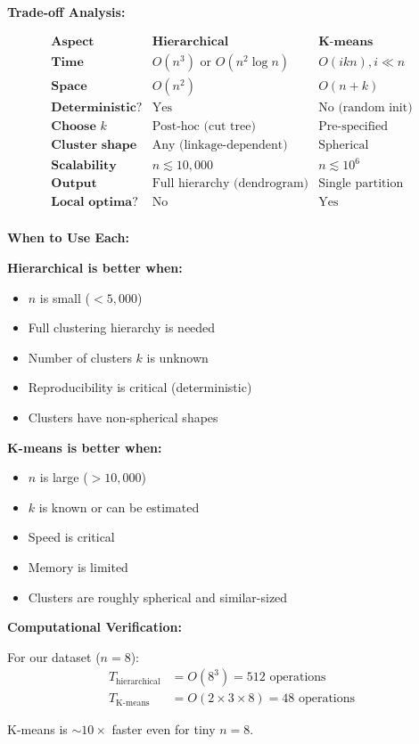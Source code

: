\documentclass[12pt]{article}
\begin{document}
\begin{explanation}
\textbf{Trade-off Analysis:}

\[
\begin{array}{l|l|l}
\textbf{Aspect} & \textbf{Hierarchical} & \textbf{K-means} \\
\hline
\textbf{Time} & O(n^3) \text{ or } O(n^2 \log n) & O(ikn), i \ll n \\
\textbf{Space} & O(n^2) & O(n + k) \\
\textbf{Deterministic?} & \text{Yes} & \text{No (random init)} \\
\textbf{Choose } k & \text{Post-hoc (cut tree)} & \text{Pre-specified} \\
\textbf{Cluster shape} & \text{Any (linkage-dependent)} & \text{Spherical} \\
\textbf{Scalability} & n \lesssim 10{,}000 & n \lesssim 10^6 \\
\textbf{Output} & \text{Full hierarchy (dendrogram)} & \text{Single partition} \\
\textbf{Local optima?} & \text{No} & \text{Yes} \\
\end{array}
\]

\textbf{When to Use Each:}

\textbf{Hierarchical is better when:}
\begin{itemize}
\item $n$ is small ($< 5{,}000$)
\item Full clustering hierarchy is needed
\item Number of clusters $k$ is unknown
\item Reproducibility is critical (deterministic)
\item Clusters have non-spherical shapes
\end{itemize}

\textbf{K-means is better when:}
\begin{itemize}
\item $n$ is large ($> 10{,}000$)
\item $k$ is known or can be estimated
\item Speed is critical
\item Memory is limited
\item Clusters are roughly spherical and similar-sized
\end{itemize}

\textbf{Computational Verification:}

For our dataset ($n=8$):
\begin{align*}
T_{\text{hierarchical}} &= O(8^3) = 512 \text{ operations} \\
T_{\text{K-means}} &= O(2 \times 3 \times 8) = 48 \text{ operations}
\end{align*}

K-means is $\sim 10\times$ faster even for tiny $n=8$.

\end{explanation}
\end{document}
